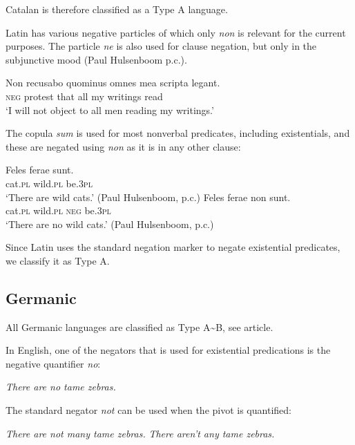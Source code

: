 \documentclass[output=paper,colorlinks,citecolor=brown]{langscibook}
\begin{document}
\begin{paperappendix}
\begin{unindented}
Catalan is therefore classified as a Type A language. 


Latin has various negative particles \parencite[129]{GreenoughKittredge1903} of which only \textit{non} is relevant for the current purposes. The particle \textit{ne} is also used for clause negation, but only in the subjunctive mood (Paul Hulsenboom p.c.).
%
\begin{exe}\ex \gll Non recusabo quominus omnes mea scripta   legant. \\
\textsc{neg} protest that all my writings read \\
    \glt `I will not object to all men reading my writings.'
\textcite[145]{Roby1862}
    \end{exe}

The copula \textit{sum} is used for most nonverbal predicates, including existentials, and these are negated using \textit{non} as it is in any other clause:
%
\begin{exe}\ex \gll Feles  ferae    sunt. \\
cat.\textsc{pl} wild.\textsc{pl} be.\textsc{3pl} \\
    \glt `There are wild cats.' (Paul Hulsenboom, p.c.)
\ex \gll Feles  ferae non sunt. \\
cat.\textsc{pl} wild.\textsc{pl} \textsc{neg} be.\textsc{3pl} \\
    \glt `There are no wild cats.' (Paul Hulsenboom, p.c.)
    \end{exe}

Since Latin uses the standard negation marker to negate existential predicates, we classify it as Type A. 

\subsection{Germanic} %

All Germanic languages are classified as Type A{\textasciitilde}B, see article.


In English, one of the negators that is used for existential predications is the negative quantifier \textit{no}: 
%
\begin{exe}\ex \textit{There are no tame zebras.}
    \end{exe}

The standard negator \textit{not} can be used when the pivot is quantified:
%
\begin{exe}\ex \begin{xlist}
\ex \textit{There are not many tame zebras.}
\ex \textit{There aren’t any tame zebras.}
    \end{xlist}\end{exe}


\end{unindented}
\end{paperappendix}
\end{document}
